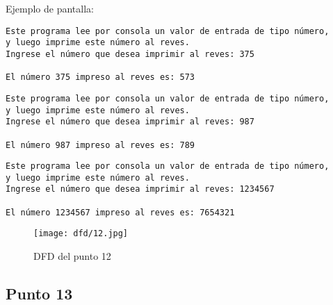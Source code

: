 	Ejemplo de pantalla:
\begin{lstlisting}
Este programa lee por consola un valor de entrada de tipo número,
y luego imprime este número al reves.
Ingrese el número que desea imprimir al reves: 375

El número 375 impreso al reves es: 573
\end{lstlisting}

\begin{lstlisting}
Este programa lee por consola un valor de entrada de tipo número,
y luego imprime este número al reves.
Ingrese el número que desea imprimir al reves: 987

El número 987 impreso al reves es: 789
\end{lstlisting}

\begin{lstlisting}
Este programa lee por consola un valor de entrada de tipo número,
y luego imprime este número al reves.
Ingrese el número que desea imprimir al reves: 1234567

El número 1234567 impreso al reves es: 7654321
\end{lstlisting}

\begin{figure}
    \centering
    \texttt{[image: dfd/12.jpg]}
    \caption{ DFD del punto 12}
    \label{fig: DFD del punto 12}
\end{figure}





\subsection{Punto 13}
	
